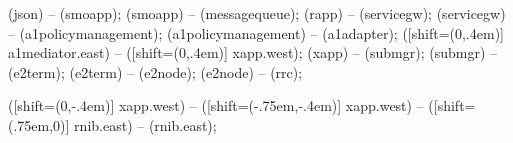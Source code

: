  (json) -- (smoapp);
 (smoapp) -- (messagequeue);
 (rapp) -- (servicegw);
 (servicegw) -- (a1policymanagement);
 (a1policymanagement) -- (a1adapter);
 ([shift={(0,.4em)}] a1mediator.east) -- ([shift={(0,.4em)}] xapp.west);
 (xapp) -- (submgr);
 (submgr) -- (e2term);
 (e2term) -- (e2node);
 (e2node) -- (rrc);

 ([shift={(0,-.4em)}] xapp.west) -- ([shift={(-.75em,-.4em)}] xapp.west) -- ([shift={(.75em,0)}] rnib.east) -- (rnib.east);
